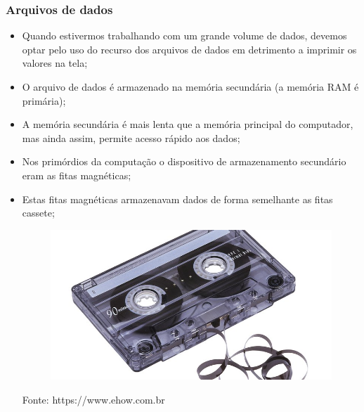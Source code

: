 \documentclass[notes=show]{beamer}
\begin{document}
\begin{frame}%

\frametitle{Arquivos de dados}

\begin{itemize}
\item Quando estivermos trabalhando com um grande volume de dados, devemos
optar pelo uso do recurso dos arquivos de dados em detrimento a imprimir os valores na
tela;

\item O arquivo de dados \'{e} armazenado na mem\'{o}ria secund\'{a}ria (a
mem\'{o}ria RAM \'{e} prim\'{a}ria);

\item A mem\'{o}ria secund\'{a}ria \'{e} mais lenta que a mem\'{o}ria
principal do computador, mas ainda assim, permite acesso r\'{a}pido aos
dados;

\item Nos prim\'{o}rdios da computa\c{c}\~{a}o o dispositivo de
armazenamento secund\'{a}rio eram as fitas magn\'{e}ticas;

\item Estas fitas magn\'{e}ticas armazenavam dados de forma semelhante as
fitas cassete;

\begin{figure}
	\includegraphics[scale=.12]{fita-k7}
\end{figure}
\begin{center}
	\tiny{Fonte: https://www.ehow.com.br}
\end{center}

\end{itemize}

\end{frame}%
\end{document}
